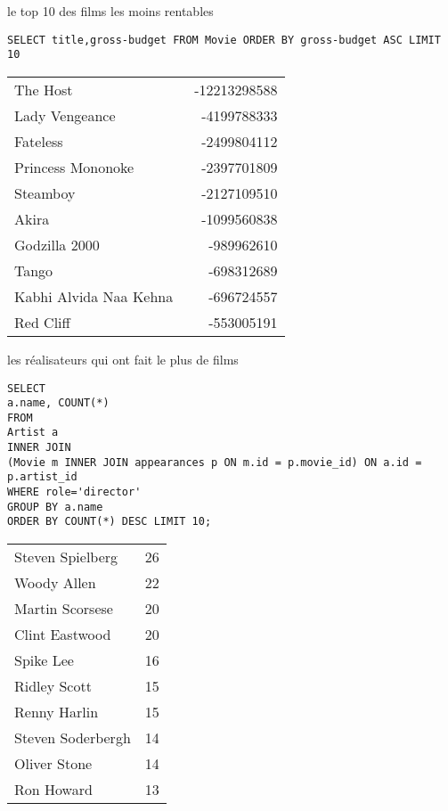 \documentclass[french]{beamer}
\begin{document}
\begin{frame}[label={sec:org4ff9b60},fragile]{le top 10 des films les moins rentables}
 \begin{verbatim}
SELECT title,gross-budget FROM Movie ORDER BY gross-budget ASC LIMIT 10
\end{verbatim}

\begin{center}
\begin{tabular}{lr}
The Host  & -12213298588\\
Lady Vengeance  & -4199788333\\
Fateless  & -2499804112\\
Princess Mononoke  & -2397701809\\
Steamboy  & -2127109510\\
Akira  & -1099560838\\
Godzilla 2000  & -989962610\\
Tango  & -698312689\\
Kabhi Alvida Naa Kehna  & -696724557\\
Red Cliff  & -553005191\\
\end{tabular}
\end{center}
\end{frame}


\begin{frame}[label={sec:orgbcfb3f1},fragile,shrink=5]{les réalisateurs qui ont fait le plus de films}
 \begin{verbatim}
SELECT
a.name, COUNT(*)
FROM
Artist a
INNER JOIN
(Movie m INNER JOIN appearances p ON m.id = p.movie_id) ON a.id = p.artist_id
WHERE role='director'
GROUP BY a.name
ORDER BY COUNT(*) DESC LIMIT 10;
\end{verbatim}

\begin{center}
\begin{tabular}{lr}
Steven Spielberg & 26\\
Woody Allen & 22\\
Martin Scorsese & 20\\
Clint Eastwood & 20\\
Spike Lee & 16\\
Ridley Scott & 15\\
Renny Harlin & 15\\
Steven Soderbergh & 14\\
Oliver Stone & 14\\
Ron Howard & 13\\
\end{tabular}
\end{center}
\end{frame}
\end{document}
